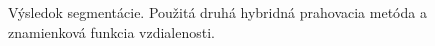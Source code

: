 \documentclass[a4paper,11pt,oneside]{article}%
\begin{document}
\begin{figure}[H]
    \hspace{5px}
    \hspace{5px}
    \caption{Výsledok segmentácie. Použitá druhá hybridná prahovacia metóda a znamienková funkcia vzdialenosti.}
    \label{fig:hybrid2_sdf}
\end{figure}
\end{document}
